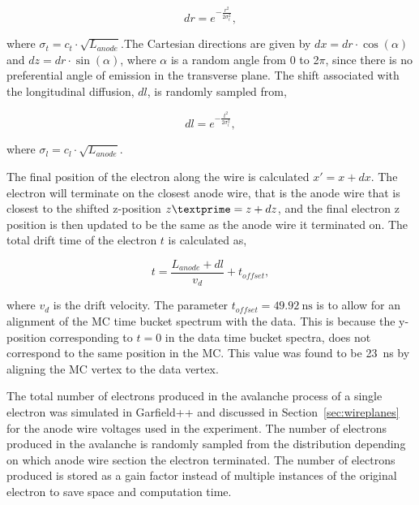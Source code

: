 \begin{equation}
dr = e^{-\frac{r^2}{2\sigma_{t}^2}},
\end{equation}

where $\sigma_{t}=c_{t}\cdot\sqrt{L_{anode}}$.The Cartesian directions are given by $dx = dr \cdot \cos(\alpha)$ and $dz = dr \cdot \sin(\alpha)$, where $\alpha$ is a random angle from 0 to 2$\pi$, since there is no preferential angle  of emission in the transverse plane. The shift associated with the longitudinal diffusion, $dl$, is randomly sampled from, 

\begin{equation}
dl = e^{-\frac{t^2}{2\sigma_{l}^2}},
\end{equation}

where $\sigma_{l}=c_{l}\cdot\sqrt{L_{anode}}$. 

The final position of the electron along the wire is calculated  $x' = x + dx$. The electron will terminate on the closest anode wire, that is the anode wire that is closest to the shifted z-position $z\textprime = z + dz$, and the final electron z position is then updated to be the same as the anode wire it terminated on. The total drift time of the electron $t$ is calculated as,

\begin{equation}
 t = \frac{L_{anode} + dl}{v_d} + t_{offset},
 \label{eq:electronTime}
\end{equation}
 
where $v_d$ is the drift velocity. The parameter $t_{offset} = \SI{49.92}{\nano\second}$ is to allow for an alignment of the MC time bucket spectrum with the data. This is because the y-position corresponding to $t=0$ in the data time bucket spectra, does not correspond to the same position in the MC.  This value was found to be \SI{23}{\nano\second} by aligning the MC vertex to the data vertex.

The total number of electrons produced in the avalanche process of a single electron was simulated in Garfield++ and discussed in Section~\ref{sec:wireplanes} for the anode wire voltages used in the experiment. The number of electrons produced in the avalanche is randomly sampled from the distribution depending on which anode wire section the electron terminated. The number of electrons produced is stored as a gain factor instead of multiple instances of the original electron to save space and computation time. 


